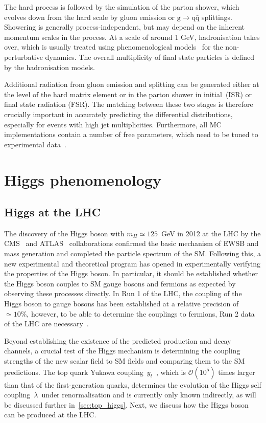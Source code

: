 The hard process is followed by the simulation of the parton shower, which evolves down from the hard scale by gluon emission or $\mathrm{g} \rightarrow \mathrm{q} \bar{\mathrm{q}}$ splittings. Showering is generally process-independent, but may depend on the inherent momentum scales in the process. At a scale of around 1 GeV, hadronisation takes over, which is usually treated using phenomenological models~\cite{Andersson:1983ia} for the non-perturbative dynamics. The overall multiplicity of final state particles is defined by the hadronisation models.

Additional radiation from gluon emission and splitting can be generated either at the level of the hard matrix element or in the parton shower in initial (ISR) or final state radiation (FSR). The matching between these two stages is therefore crucially important in accurately predicting the differential distributions, especially for events with high jet multiplicities. Furthermore, all MC implementations contain a number of free parameters, which need to be tuned to experimental data~\cite{Skands:2010ak}.


\section{Higgs phenomenology}
\subsection{Higgs at the LHC}
The discovery of the Higgs boson with $m_H \simeq 125$~GeV in 2012 at the LHC by the CMS~\cite{Chatrchyan:2012xdj} and ATLAS~\cite{Aad:2012tfa} collaborations confirmed the basic mechanism of EWSB and mass generation and completed the particle spectrum of the SM. Following this, a new experimental and theoretical program has opened in experimentally verifying the properties of the Higgs boson. In particular, it should be established whether the Higgs boson couples to SM gauge bosons and fermions as expected by observing these processes directly. In Run 1 of the LHC, the coupling of the Higgs boson to gauge bosons has been established at a relative precision of $\simeq 10\%$, however, to be able to determine the couplings to fermions, Run 2 data of the LHC are necessary~\cite{Khachatryan:2016vau}.

Beyond establishing the existence of the predicted production and decay channels, a crucial test of the Higgs mechanism is determining the coupling strengths of the new scalar field to SM fields and comparing them to the SM predictions. The top quark Yukawa coupling~$y_t$~, which is $\mathcal{O}(10^5)$ times larger than that of the first-generation quarks, determines the evolution of the Higgs self coupling~$\lambda$~under renormalisation and is currently only known indirectly, as will be discussed further in~\cref{sec:top_higgs}. Next, we discuss how the Higgs boson can be produced at the LHC. 

